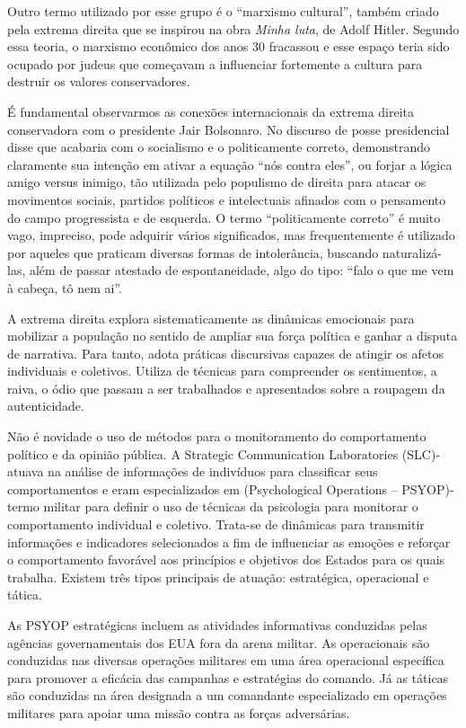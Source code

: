 Outro termo utilizado por esse grupo é o ``marxismo cultural'', também
criado pela extrema direita que se inspirou na obra \emph{Minha luta},
de Adolf Hitler. Segundo essa teoria, o marxismo econômico dos anos 30
fracassou e esse espaço teria sido ocupado por judeus que começavam a
influenciar fortemente a cultura para destruir os valores conservadores.

É fundamental observarmos as conexões internacionais da extrema direita
conservadora com o presidente Jair Bolsonaro. No discurso de posse
presidencial disse que acabaria com o socialismo e o politicamente
correto, demonstrando claramente sua intenção em ativar a equação ``nós
contra eles'', ou forjar a lógica amigo versus inimigo, tão utilizada
pelo populismo de direita para atacar os movimentos sociais, partidos
políticos e intelectuais afinados com o pensamento do campo progressista
e de esquerda. O termo ``politicamente correto'' é muito vago,
impreciso, pode adquirir vários significados, mas frequentemente é
utilizado por aqueles que praticam diversas formas de intolerância,
buscando naturalizá-las, além de passar atestado de espontaneidade, algo
do tipo: ``falo o que me vem à cabeça, tô nem ai''.

A extrema direita explora sistematicamente as dinâmicas emocionais para
mobilizar a população no sentido de ampliar sua força política e ganhar
a disputa de narrativa. Para tanto, adota práticas discursivas capazes
de atingir os afetos individuais e coletivos. Utiliza de técnicas para
compreender os sentimentos, a raiva, o ódio que passam a ser trabalhados
e apresentados sobre a roupagem da autenticidade.

Não é novidade o uso de métodos para o monitoramento do comportamento
político e da opinião pública. A Strategic Communication Laboratories
(SLC)- atuava na análise de informações de indivíduos para classificar
seus comportamentos e eram especializados em (Psychological Operations
-- PSYOP)- termo militar para definir o uso de técnicas da psicologia
para monitorar o comportamento individual e coletivo. Trata-se de
dinâmicas para transmitir informações e indicadores selecionados a fim
de influenciar as emoções e reforçar o comportamento favorável aos
princípios e objetivos dos Estados para os quais trabalha. Existem três
tipos principais de atuação: estratégica, operacional e tática.

As PSYOP estratégicas incluem as atividades informativas conduzidas
pelas agências governamentais dos EUA fora da arena militar. As
operacionais são conduzidas nas diversas operações militares em uma área
operacional específica para promover a eficácia das campanhas e
estratégias do comando. Já as táticas são conduzidas na área designada a
um comandante especializado em operações militares para apoiar uma
missão contra as forças adversárias.

